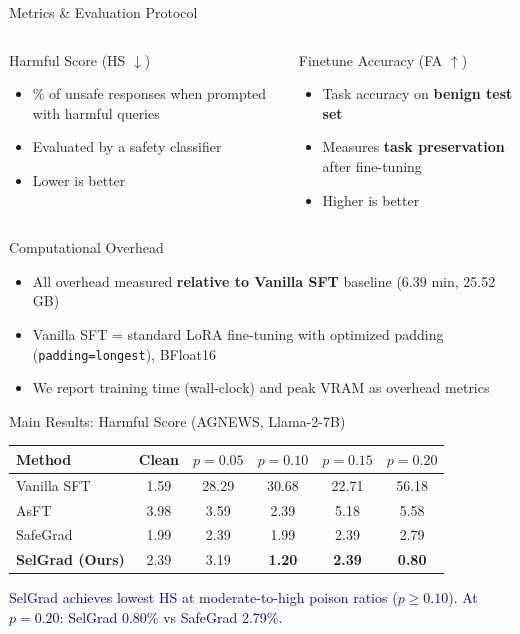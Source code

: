 \documentclass[aspectratio=169, 11pt]{beamer}
\newcommand{\takeaway}[1]{%
\vfill
\begin{center}
\colorbox{darkblue!8}{\parbox{0.92\textwidth}{\centering\small\textcolor{darkblue}{#1}}}
\end{center}
}
\begin{document}
\begin{frame}{Metrics \& Evaluation Protocol}
\vspace{10pt}
\begin{columns}[c]
\begin{block}{Harmful Score (HS $\downarrow$)}
\begin{itemize}
  \item \% of unsafe responses when prompted with harmful queries
  \item Evaluated by a safety classifier
  \item Lower is better
\end{itemize}
\end{block}

\begin{exampleblock}{Finetune Accuracy (FA $\uparrow$)}
\begin{itemize}
  \item Task accuracy on \textbf{benign test set}
  \item Measures \textbf{task preservation} after fine-tuning
  \item Higher is better
\end{itemize}
\end{exampleblock}
\end{columns}

\vspace{12pt}
\begin{block}{Computational Overhead}
\begin{itemize}
  \item All overhead measured \textbf{relative to Vanilla SFT} baseline (6.39 min, 25.52 GB)
  \item Vanilla SFT = standard LoRA fine-tuning with optimized padding (\texttt{padding=longest}), BFloat16
  \item We report training time (wall-clock) and peak VRAM as overhead metrics
\end{itemize}
\end{block}
\end{frame}

\begin{frame}{Main Results: Harmful Score (AGNEWS, Llama-2-7B)}
\vspace{4pt}
\centering
\small
\renewcommand{\arraystretch}{1.15}
\begin{tabular}{lccccc}
\toprule
\textbf{Method} & \textbf{Clean} & $p{=}0.05$ & $p{=}0.10$ & $p{=}0.15$ & $p{=}0.20$ \\
\midrule
Vanilla SFT & 1.59 & 28.29 & 30.68 & 22.71 & 56.18 \\
AsFT & 3.98 & 3.59 & 2.39 & 5.18 & 5.58 \\
SafeGrad & 1.99 & 2.39 & 1.99 & 2.39 & 2.79 \\
\rowcolor{green!10}
\textbf{SelGrad (Ours)} & 2.39 & 3.19 & \textbf{1.20} & \textbf{2.39} & \textbf{0.80} \\
\bottomrule
\end{tabular}
\takeaway{SelGrad achieves lowest HS at moderate-to-high poison ratios ($p \geq 0.10$). At $p{=}0.20$: SelGrad 0.80\% vs SafeGrad 2.79\%.}
\end{frame}
\end{document}
